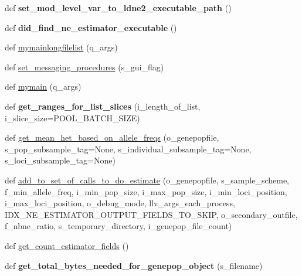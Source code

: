 \begin{DoxyCompactItemize}
\item 
def {\bfseries set\+\_\+mod\+\_\+level\+\_\+var\+\_\+to\+\_\+ldne2\+\_\+executable\+\_\+path} ()\hypertarget{namespacenegui_1_1pgdriveneestimator_a5d449c8ab43f1e25695a00307cc55862}{}\label{namespacenegui_1_1pgdriveneestimator_a5d449c8ab43f1e25695a00307cc55862}

\item 
def {\bfseries did\+\_\+find\+\_\+ne\+\_\+estimator\+\_\+executable} ()\hypertarget{namespacenegui_1_1pgdriveneestimator_a18217c273c60b3009f24ab642d00bae5}{}\label{namespacenegui_1_1pgdriveneestimator_a18217c273c60b3009f24ab642d00bae5}

\item 
def \hyperlink{namespacenegui_1_1pgdriveneestimator_a4010f65f71a1bce539c5e15317632be2}{mymainlongfilelist} (q\+\_\+args)
\item 
def \hyperlink{namespacenegui_1_1pgdriveneestimator_a54013fc419eb559e07a5d278baa3fc6d}{set\+\_\+messaging\+\_\+procedures} (s\+\_\+gui\+\_\+flag)
\item 
def \hyperlink{namespacenegui_1_1pgdriveneestimator_a8344146a59d84da02da349abd68723ad}{mymain} (q\+\_\+args)
\item 
def {\bfseries get\+\_\+ranges\+\_\+for\+\_\+list\+\_\+slices} (i\+\_\+length\+\_\+of\+\_\+list, i\+\_\+slice\+\_\+size=P\+O\+O\+L\+\_\+\+B\+A\+T\+C\+H\+\_\+\+S\+I\+ZE)\hypertarget{namespacenegui_1_1pgdriveneestimator_a093ecb7ad7eaff69fd621e066fcdc29d}{}\label{namespacenegui_1_1pgdriveneestimator_a093ecb7ad7eaff69fd621e066fcdc29d}

\item 
def \hyperlink{namespacenegui_1_1pgdriveneestimator_a810fb4b95084358f69aafdc1e048451d}{get\+\_\+mean\+\_\+het\+\_\+based\+\_\+on\+\_\+allele\+\_\+freqs} (o\+\_\+genepopfile, s\+\_\+pop\+\_\+subsample\+\_\+tag=None, s\+\_\+individual\+\_\+subsample\+\_\+tag=None, s\+\_\+loci\+\_\+subsample\+\_\+tag=None)
\item 
def \hyperlink{namespacenegui_1_1pgdriveneestimator_a4d13e12b51231deb46355be190102cbc}{add\+\_\+to\+\_\+set\+\_\+of\+\_\+calls\+\_\+to\+\_\+do\+\_\+estimate} (o\+\_\+genepopfile, s\+\_\+sample\+\_\+scheme, f\+\_\+min\+\_\+allele\+\_\+freq, i\+\_\+min\+\_\+pop\+\_\+size, i\+\_\+max\+\_\+pop\+\_\+size, i\+\_\+min\+\_\+loci\+\_\+position, i\+\_\+max\+\_\+loci\+\_\+position, o\+\_\+debug\+\_\+mode, llv\+\_\+args\+\_\+each\+\_\+process, I\+D\+X\+\_\+\+N\+E\+\_\+\+E\+S\+T\+I\+M\+A\+T\+O\+R\+\_\+\+O\+U\+T\+P\+U\+T\+\_\+\+F\+I\+E\+L\+D\+S\+\_\+\+T\+O\+\_\+\+S\+K\+IP, o\+\_\+secondary\+\_\+outfile, f\+\_\+nbne\+\_\+ratio, s\+\_\+temporary\+\_\+directory, i\+\_\+genepop\+\_\+file\+\_\+count)
\item 
def \hyperlink{namespacenegui_1_1pgdriveneestimator_aaf461586686c9d7f0bf90188ab241dcc}{get\+\_\+count\+\_\+estimator\+\_\+fields} ()
\item 
def {\bfseries get\+\_\+total\+\_\+bytes\+\_\+needed\+\_\+for\+\_\+genepop\+\_\+object} (s\+\_\+filename)\hypertarget{namespacenegui_1_1pgdriveneestimator_ab41c87e91be7262bc61207e9e987fcd2}{}\label{namespacenegui_1_1pgdriveneestimator_ab41c87e91be7262bc61207e9e987fcd2}


\end{DoxyCompactItemize}
